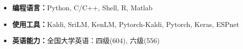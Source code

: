   \begin{itemize}[leftmargin=*]
    \item \textbf{编程语言：}Python, C/C++, Shell, R, Matlab 
    \item \textbf{使用工具：}Kaldi, SriLM, KenLM, Pytorch-Kaldi,  Pytorch, Keras, ESPnet
    \item \textbf{英语能力：}全国大学英语：四级(604), 六级(556)
  \end{itemize}